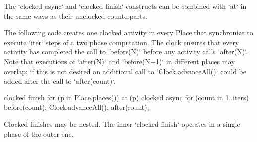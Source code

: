 The \xcd`clocked async` and \xcd`clocked finish` constructs can be
combined with \xcd`at` in the same ways as their unclocked
counterparts.

\begin{ex} The following code creates one clocked 
activity in every Place that synchronize to execute \xcd`iter` steps
of a two phase computation.  The clock ensures that every activity has
completed the call to \xcd`before(N)` before any activity calls
\xcd`after(N)`. Note that executions of \xcd`after(N)` and
\xcd`before(N+1)` in different places may overlap; if this is not
desired an additional call to \xcd`Clock.advanceAll()` could be added
after the call to \xcd`after(count)`.

\begin{xten}
clocked finish {
  for (p in Place.places()) {
     at (p) clocked async {
       for (count in 1..iters) {
         before(count);
         Clock.advanceAll();
         after(count);
       }
     }
  }
}
\end{xten}
\end{ex}


Clocked finishes may be nested.  The inner \xcd`clocked finish` operates in a
single phase of the outer one.  
